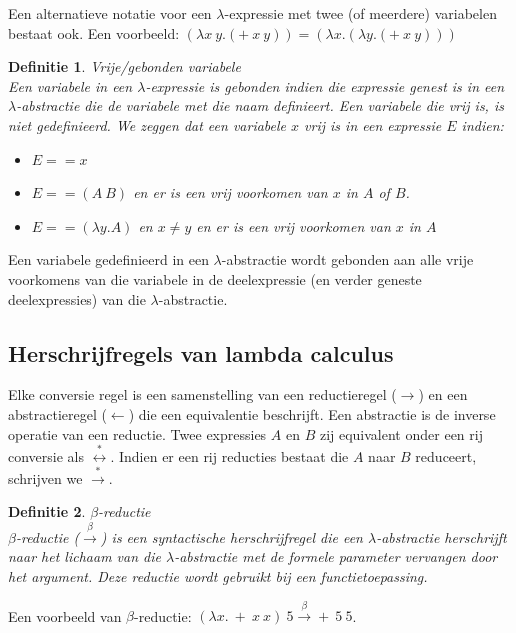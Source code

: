 \documentclass[a4paper]{article}
\newtheorem{tdefinitie}{Definitie}[section]
\newenvironment{definitie}[1]%
  {\begin{mdframed}[backgroundcolor=silver,
    topline=false,
    rightline=false,
    leftline=false,
    bottomline=false]\begin{tdefinitie}#1\\\normalfont}%
  {\end{tdefinitie}\end{mdframed}}
\begin{document}
Een alternatieve notatie voor een $\lambda$-expressie met twee (of meerdere) variabelen bestaat ook. Een voorbeeld: $(\lambda x\ y.(+\ x\ y)) = (\lambda x.(\lambda y.(+\ x\ y)))$

\begin{definitie}{Vrije/gebonden variabele}
  Een variabele in een $\lambda$-expressie is gebonden indien die expressie genest is in een $\lambda$-abstractie die de variabele met die naam definieert. Een variabele die vrij is, is niet gedefinieerd. We zeggen dat een variabele $x$ vrij is in een expressie $E$ indien:
  \begin{itemize}
  \item $E == x$
  \item $E == (A\ B)$ en er is een vrij voorkomen van $x$ in $A$ of $B$.
  \item $E == (\lambda y. A)$ en $x \neq y$ en er is een vrij voorkomen van $x$ in $A$
  \end{itemize}
\end{definitie}

Een variabele gedefinieerd in een $\lambda$-abstractie wordt gebonden aan alle vrije voorkomens van die variabele in de deelexpressie (en verder geneste deelexpressies) van die $\lambda$-abstractie.

\subsection{Herschrijfregels van lambda calculus}

Elke conversie regel is een samenstelling van een reductieregel ($\longrightarrow$) en een abstractieregel ($\longleftarrow$) die een equivalentie beschrijft. Een abstractie is de inverse operatie van een reductie. Twee expressies $A$ en $B$ zij equivalent onder een rij conversie als $\stackrel{*}{\longleftrightarrow}$. Indien er een rij reducties bestaat die $A$ naar $B$ reduceert, schrijven we $\stackrel{*}{\longrightarrow}$.

\begin{definitie}{$\beta$-reductie}
  $\beta$-reductie ($\stackrel{\beta}{\longrightarrow}$) is een syntactische herschrijfregel die een $\lambda$-abstractie herschrijft naar het lichaam van die $\lambda$-abstractie met de formele parameter vervangen door het argument. Deze reductie wordt gebruikt bij een functietoepassing.
\end{definitie}

Een voorbeeld van $\beta$-reductie: $(\lambda x.\ +\ x\ x)\ 5 \stackrel{\beta}{\longrightarrow} +\ 5\ 5$.
\end{document}
